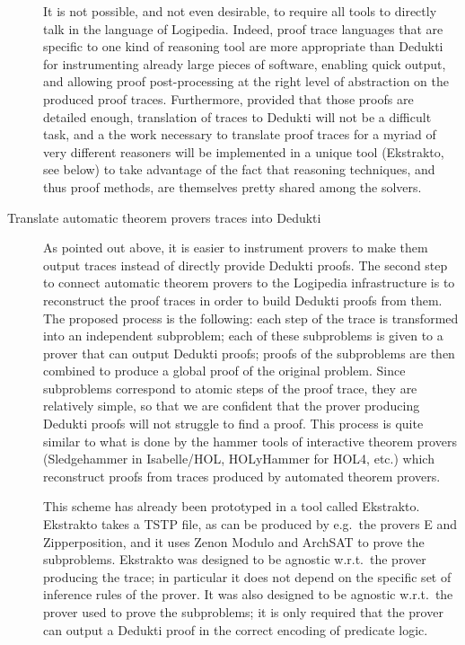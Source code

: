 \begin{description}
  It is not possible, and not even desirable, to require all tools to directly
  talk in the language of Logipedia.  Indeed, proof trace languages that are
  specific to one kind of reasoning tool are more appropriate than Dedukti for
  instrumenting already large pieces of software, enabling quick output, and
  allowing proof post-processing at the right level of abstraction on the
  produced proof traces.  Furthermore, provided that those proofs are detailed
  enough, translation of traces to Dedukti will not be a difficult task, and a
  the work necessary to translate proof traces for a myriad of very different
  reasoners will be implemented in a unique tool (Ekstrakto, see below) to take
  advantage of the fact that reasoning techniques, and thus proof methods, are
  themselves pretty shared among the solvers.

\item[Translate automatic theorem provers traces into Dedukti] As pointed out above, it is easier to
  instrument provers to make them output traces instead of directly provide
  Dedukti proofs. The second step to connect automatic theorem provers to the Logipedia
  infrastructure is to reconstruct the proof traces in order to build Dedukti
  proofs from them. The proposed process is the following: each step of the
  trace is transformed into an independent subproblem; each of these subproblems
  is given to a prover that can output Dedukti proofs; proofs of the subproblems
  are then combined to produce a global proof of the original problem.  Since
  subproblems correspond to atomic steps of the proof trace, they are relatively
  simple, so that we are confident that the prover producing Dedukti proofs will
  not struggle to find a proof. This process is quite similar to what is done by
  the hammer tools of interactive theorem provers (Sledgehammer in Isabelle/HOL,
  HOLyHammer for HOL4, etc.) which reconstruct proofs from traces produced by
  automated theorem provers.

  This scheme has already been prototyped in a tool called
  Ekstrakto. Ekstrakto takes a TSTP file, as can be produced by
  e.g.\ the provers E and Zipperposition, and it uses Zenon Modulo and
  ArchSAT to prove the subproblems. Ekstrakto was designed to be
  agnostic w.r.t.\ the prover producing the trace; in particular it
  does not depend on the specific set of inference rules of the
  prover. It was also designed to be agnostic w.r.t.\ the prover used
  to prove the subproblems; it is only required that the prover can
  output a Dedukti proof in the correct encoding of predicate logic.


\end{description}
